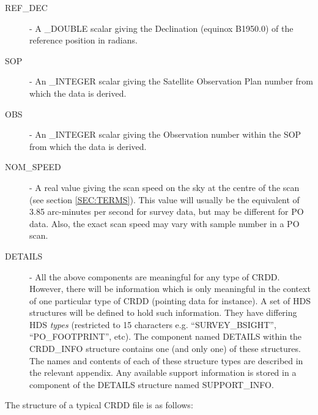 \begin {description}
\item [REF\_DEC] - A \_DOUBLE scalar giving the Declination (equinox B1950.0)
of the reference position in radians.

\item [SOP] - An \_INTEGER scalar giving the Satellite Observation Plan number
from which the data is derived.

\item [OBS] - An \_INTEGER scalar giving the Observation number within the
SOP from which the data is derived.

\item [NOM\_SPEED] - A real value giving the scan speed on the sky at the
centre of the scan (see section \ref {SEC:TERMS}). This value will usually
be the equivalent of 3.85 arc-minutes per second for survey data, but may be
different for PO data. Also, the exact scan speed may vary with sample number
in a PO scan.

\item [DETAILS] - All the above components are meaningful for any type of CRDD.
However, there will be information which is only meaningful in the context of
one particular type of CRDD (pointing data for instance). A set of HDS
structures will be defined to hold such information. They have differing HDS
{\em types} (restricted to 15 characters e.g. ``SURVEY\_BSIGHT'',
``PO\_FOOTPRINT'', etc). The component named DETAILS within the CRDD\_INFO
structure contains one (and only one) of these structures. The names and
contents of each of these structure types are described in the relevant
appendix. Any available support information is stored in a component of the
DETAILS structure named SUPPORT\_INFO.

\end {description}
\newpage

The structure of a typical CRDD file is as follows:

